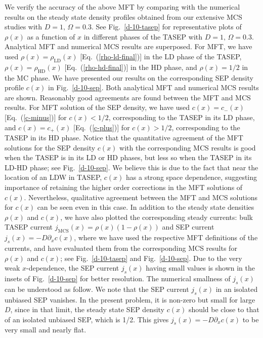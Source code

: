 \documentclass[aps,pre,twocolumn,superscriptaddress,amsmath,amssymb,longbibliography,floatfix,nofootinbib]{revtex4}
\begin{document}
{We verify the accuracy of the above MFT by comparing with the numerical results on the steady state density profiles obtained from our extensive MCS studies with $D=1,\,\Omega=0.3$. See Fig.~\ref{d-10-tasep} for representative plots of $\rho(x)$ as a function of $x$ in different phases of the TASEP with $D=1,\,\Omega=0.3$. Analytical MFT and numerical MCS results are superposed. For MFT, we have used $\rho(x)=\rho_\text{LD}(x)$ [Eq.~(\ref{rho-ld-final})] in the LD phase of the TASEP,  $\rho(x)=\rho_\text{HD}(x)$ [Eq.~(\ref{rho-hd-final})] in the HD phase, and $\rho(x)=1/2$ in the MC phase. We have presented our results on the corresponding SEP density profile $c(x)$ in  Fig.~\ref{d-10-sep}. Both analytical MFT and numerical MCS results are shown. Reasonably good agreements are found between the MFT and MCS results. For MFT solution of the SEP density, we have used $c(x)=c_-(x)$ [Eq.~(\ref{c-minus})] for $c(x)<1/2$, corresponding to the TASEP in its LD phase, and $c(x)=c_+(x)$ [Eq.~(\ref{c-plus})] for $c(x)>1/2$, corresponding to the TASEP in its HD phase. 
{Notice that the quantitative agreement of the MFT solutions for the SEP density $c(x)$ with the corresponding MCS results %
is good when the TASEP is in its LD or HD phases, but less so when the TASEP in its LD-HD phase; see Fig.~\ref{d-10-sep}. We believe this is due to the fact that near the location of an LDW in TASEP, $c(x)$ has a strong space dependence, suggesting importance of retaining the higher order corrections in the MFT solutions of $c(x)$. Nevertheless, qualitative agreement between the MFT and MCS solutions for $c(x)$ can be seen even in this case.} { In addition to the steady state densities $\rho(x)$ and $c(x)$, we have also plotted the corresponding steady currents: bulk TASEP current $j_\text{MCS}(x)=\rho(x)(1-\rho (x))$ and SEP current $ j_s(x)=-D\partial_x c(x)$, where we have used the respective MFT definitions of the currents, and have evaluated them from the corresponding MCS results for $\rho(x)$ and $c(x)$; see Fig.~\ref{d-10-tasep} and Fig.~\ref{d-10-sep}. Due to the very weak $x$-dependence, the SEP current $j_s(x)$ having small values is shown in the insets of Fig.~\ref{d-10-sep} for better resolution. The numerical smallness of $j_s(x)$ can be understood as follow. We note that the SEP current $j_s(x)$ in an isolated unbiased SEP vanishes. In the present problem, it is non-zero but small for large $D$, since in that limit, the steady state SEP density $c(x)$ should be close to that of an isolated unbiased SEP, which is 1/2. This gives $j_s(x)=-D\partial_x c(x)$ to be very small and nearly flat. } 


}
\end{document}
